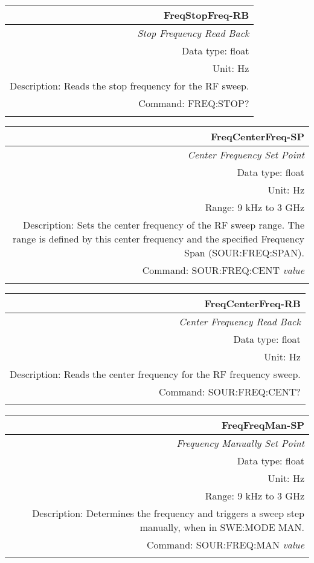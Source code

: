 \documentclass[openany]{article}
\begin{document}
		\begin{tabular}{N}
			\hline
			\bfseries FreqStopFreq-RB \\ \hline
			\emph{Stop Frequency Read Back} \\
			Data type: float \\
			Unit: Hz \\
			Description: Reads the stop frequency for the RF sweep. \\
			Command: FREQ:STOP? \\
			\\

		\end{tabular}


		\begin{tabular}{N}
			\hline
			\bfseries FreqCenterFreq-SP \\ \hline
			\emph{Center Frequency Set Point} \\
			Data type: float \\
			Unit: Hz \\
			Range: 9 kHz to 3 GHz \\
			Description: Sets the center frequency of the RF sweep range. The range is defined by this center frequency and the specified Frequency Span (SOUR:FREQ:SPAN). \\
			Command: SOUR:FREQ:CENT \emph{value} \\
			\\
			
		\end{tabular}


		\begin{tabular}{N}
			\hline
			\bfseries FreqCenterFreq-RB \\ \hline
			\emph{Center Frequency Read Back} \\
			Data type: float \\
			Unit: Hz \\
			Description: Reads the center frequency for the RF frequency sweep. \\
			Command: SOUR:FREQ:CENT? \\
			\\

		\end{tabular}


		\begin{tabular}{N}
			\hline
			\bfseries FreqFreqMan-SP \\ \hline
			\emph{Frequency Manually Set Point} \\
			Data type: float \\
			Unit: Hz \\
			Range: 9 kHz to 3 GHz \\
			Description: Determines the frequency and triggers a sweep step manually, when in SWE:MODE MAN. \\
			Command: SOUR:FREQ:MAN \emph{value} \\
			\\
			
		\end{tabular}
\end{document}
